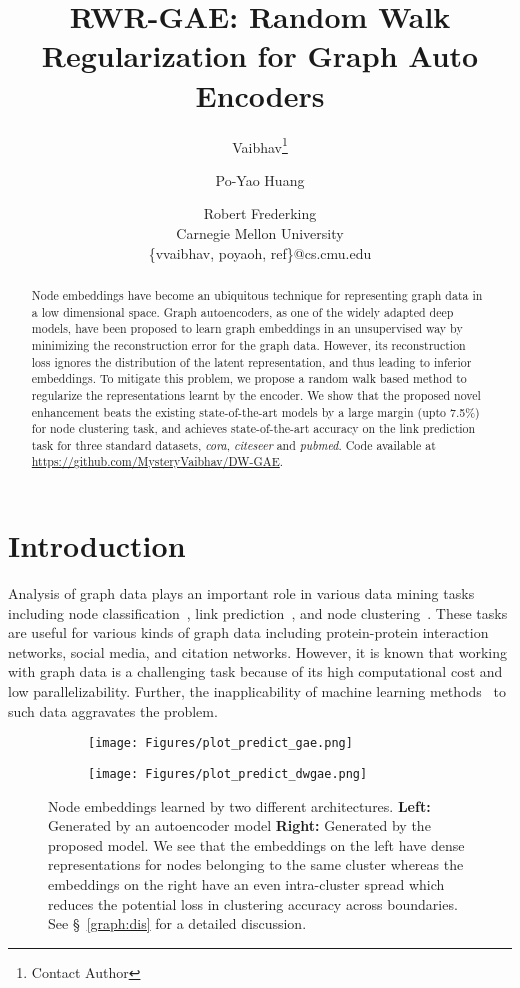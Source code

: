 \documentclass{article}
\title{RWR-GAE: Random Walk Regularization for Graph Auto Encoders}
\author{
Vaibhav\footnote{Contact Author}\and
Po-Yao Huang\and
Robert Frederking\\
\affiliations
Carnegie Mellon University\\
\emails
\{vvaibhav, poyaoh, ref\}@cs.cmu.edu}
\begin{document}
\maketitle

\begin{abstract}
Node embeddings have become an ubiquitous technique for representing graph data in a low dimensional space. Graph autoencoders, as one of the widely adapted deep models, have been proposed to learn graph embeddings in an unsupervised way by minimizing the reconstruction error for the graph data. However, its reconstruction loss ignores the distribution of the latent representation, and thus leading to inferior embeddings. To mitigate this problem, we propose a random walk based method to regularize the representations learnt by the encoder. We show that the proposed novel enhancement beats the existing state-of-the-art models by a large margin (upto 7.5\%) for node clustering task, and achieves state-of-the-art accuracy on the link prediction task for three standard datasets, \emph{cora}, \emph{citeseer} and \emph{pubmed}. Code available at \url{https://github.com/MysteryVaibhav/DW-GAE}.
\end{abstract}

\section{Introduction}

Analysis of graph data plays an important role in various data mining tasks including node classification~\cite{kipf2016semi}, link prediction~\cite{wang2017predictive}, and node clustering~\cite{wang2017mgae}. These tasks are useful for various kinds of graph data including protein-protein interaction networks, social media, and citation networks. However, it is known that working with graph data is a challenging task because of its high computational cost and low parallelizability. Further, the inapplicability of machine learning methods~\cite{cui2018survey} to such data aggravates the problem.

\begin{figure}[t]
\centering
\begin{subfigure}{.25\textwidth}
  \texttt{[image: Figures/plot\_predict\_gae.png]}
\end{subfigure}\begin{subfigure}{.45\textwidth}
  \texttt{[image: Figures/plot\_predict\_dwgae.png]}
\end{subfigure}\caption {Node embeddings learned by two different architectures. \textbf{Left:} Generated by an autoencoder model \textbf{Right:} Generated by the proposed model. We see that the embeddings on the left have dense representations for nodes belonging to the same cluster whereas the embeddings on the right have an even intra-cluster spread which reduces the potential loss in clustering accuracy across boundaries. See \S~\ref{graph:dis} for a detailed discussion.}
\label{fig:example}
\vspace{-1\baselineskip}
\end{figure}
\end{document}
